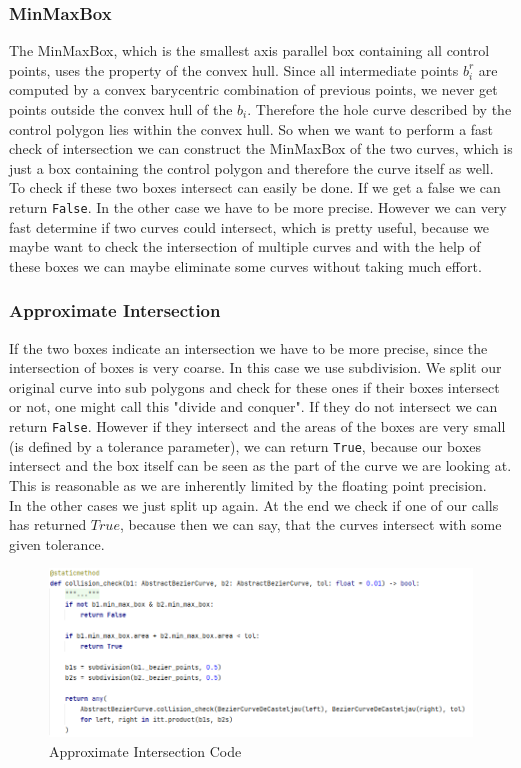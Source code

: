 \subsubsection{MinMaxBox}
The MinMaxBox, which is the smallest axis parallel box containing all control points, uses the property of the convex hull. Since all intermediate points $b_i^r$ are computed by a convex barycentric combination of previous points, we never get points outside the convex hull of the $b_i$. Therefore the hole curve described by the control polygon lies within the convex hull. So when we want to perform a fast check of intersection we can construct the MinMaxBox of the two curves, which is just a box containing the control polygon and therefore the curve itself as well. To check if these two boxes intersect can easily be done. If we get a false we can return \texttt{False}. In the other case we have to be more precise. However we can very fast determine if two curves could intersect, which is pretty useful, because we maybe want to check the intersection of multiple curves and with the help of these boxes we can maybe eliminate some curves without taking much effort. 
\subsubsection{Approximate Intersection}
If the two boxes indicate an intersection we have to be more precise, since the intersection of boxes is very coarse. In this case we use subdivision. We split our original curve into sub polygons and check for these ones if their boxes intersect or not, one might call this "divide and conquer". If they do not intersect we can return \texttt{False}. However if they intersect and the areas of the boxes are very small (is defined by a tolerance parameter), we can return \texttt{True}, because our boxes intersect and the box itself can be seen as the part of the curve we are looking at. This is reasonable as we are inherently limited by the floating point precision.\\

In the other cases we just split up again. At the end we check if one of our calls has returned $True$, because then we can say, that the curves intersect with some given tolerance.
\begin{figure}[H]
    \centering
    \includegraphics[width=\textwidth]{collision_check.png}
    \caption{Approximate Intersection Code}
    \label{fig:my_label}
\end{figure}

